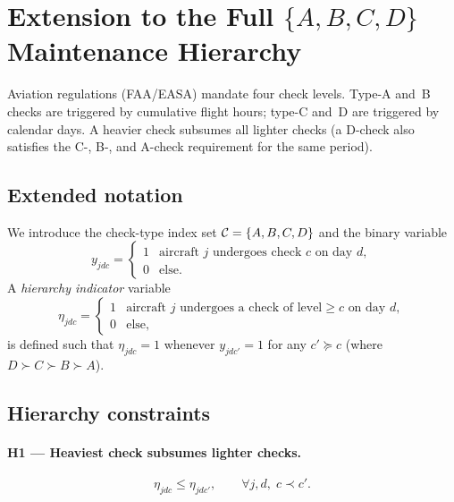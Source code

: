 \section{Extension to the Full \texorpdfstring{$\{A, B, C, D\}$}{ABCD}
         Maintenance Hierarchy}
\label{sec:hierarchy}

Aviation regulations (FAA/EASA) mandate four check levels.  Type-A and~B
checks are triggered by cumulative flight hours; type-C and~D are triggered
by calendar days.  A heavier check subsumes all lighter checks (a D-check
also satisfies the C-, B-, and A-check requirement for the same period).

\subsection{Extended notation}

We introduce the check-type index set $\mathcal{C} = \{A, B, C, D\}$ and the binary
variable
\begin{equation}
  y_{jdc} = \begin{cases} 1 & \text{aircraft } j \text{ undergoes check }
    c \text{ on day } d, \\ 0 & \text{else.} \end{cases}
\end{equation}
A \emph{hierarchy indicator} variable
\begin{equation}
  \eta_{jdc} = \begin{cases} 1 & \text{aircraft } j \text{ undergoes a check
    of level} \ge c \text{ on day } d, \\ 0 & \text{else,} \end{cases}
\end{equation}
is defined such that $\eta_{jdc} = 1$ whenever $y_{jdc'} = 1$ for any $c'
\succeq c$ (where $D \succ C \succ B \succ A$).

\subsection{Hierarchy constraints}

\paragraph{H1 — Heaviest check subsumes lighter checks.}
\begin{equation}\label{eq:hier1}
  \eta_{jdc} \le \eta_{jdc'}, \qquad \forall j,d,\; c \prec c'.
\end{equation}

